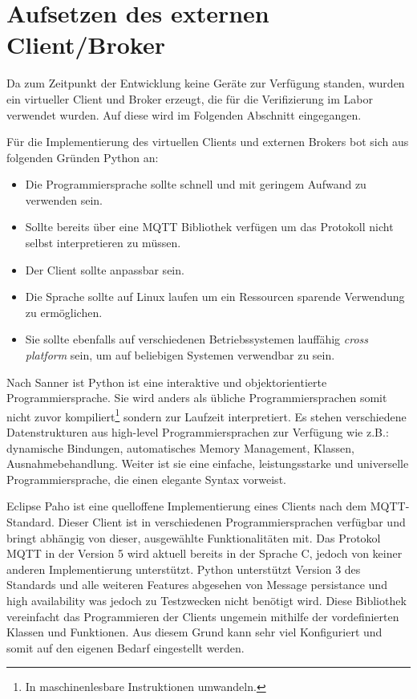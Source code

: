 \section{Aufsetzen des externen Client/Broker}
    Da zum Zeitpunkt der Entwicklung keine Geräte zur Verfügung standen, wurden ein virtueller Client und Broker erzeugt, die für die Verifizierung im Labor verwendet wurden.
    Auf diese wird im Folgenden Abschnitt eingegangen.

    Für die Implementierung des virtuellen Clients und externen Brokers bot sich aus folgenden Gründen Python an:
    \begin{itemize}
        \item Die Programmiersprache sollte schnell und mit geringem Aufwand zu verwenden sein.
        \item Sollte bereits über eine \ac{MQTT} Bibliothek verfügen um das Protokoll nicht selbst interpretieren zu müssen.
        \item Der Client sollte anpassbar sein.
        \item Die Sprache sollte auf Linux laufen um ein Ressourcen sparende Verwendung zu ermöglichen.
        \item Sie sollte ebenfalls auf verschiedenen Betriebssystemen lauffähig \emph{cross platform} sein, um auf beliebigen Systemen verwendbar zu sein.
    \end{itemize}
    Nach Sanner ist Python ist eine interaktive und objektorientierte Programmiersprache. Sie wird anders als übliche Programmiersprachen somit nicht zuvor kompiliert\footnote{In maschinenlesbare Instruktionen umwandeln.} sondern zur Laufzeit interpretiert.
    Es stehen verschiedene Datenstrukturen aus high-level Programmiersprachen zur Verfügung wie z.B.: dynamische Bindungen, automatisches Memory Management, Klassen, Ausnahmebehandlung. Weiter ist sie eine einfache, leistungsstarke und universelle Programmiersprache, die einen elegante Syntax vorweist. \cite{sanner1999python}
        
    Eclipse Paho ist eine quelloffene Implementierung eines Clients nach dem \ac{MQTT}-Standard. Dieser Client ist in verschiedenen Programmiersprachen verfügbar und bringt abhängig von dieser, ausgewählte Funktionalitäten mit.
    Das Protokol \ac{MQTT} in der Version 5 wird aktuell bereits in der Sprache C, jedoch von keiner anderen Implementierung unterstützt. Python unterstützt Version 3 des Standards und alle weiteren Features abgesehen von \glqq Message persistance\grqq{} und \glqq high availability\grqq{} was jedoch zu Testzwecken nicht benötigt wird. \cite{eclipse_foundation2017}
    Diese Bibliothek vereinfacht das Programmieren der Clients ungemein mithilfe der vordefinierten Klassen und Funktionen.
    Aus diesem Grund kann sehr viel Konfiguriert und somit auf den eigenen Bedarf eingestellt werden. 

